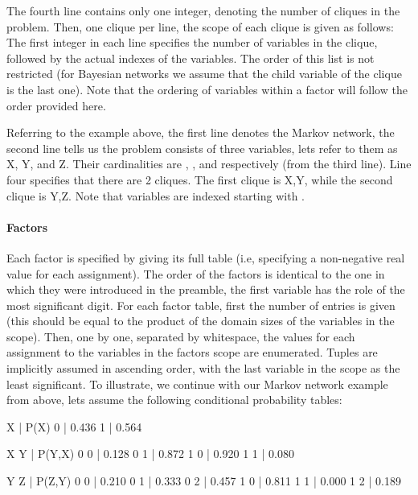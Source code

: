 The fourth line contains only one integer, denoting the number of cliques in the problem. Then, one clique per line, the scope of each clique is given as follows\+: The first integer in each line specifies the number of variables in the clique, followed by the actual indexes of the variables. The order of this list is not restricted (for Bayesian networks we assume that the child variable of the clique is the last one). Note that the ordering of variables within a factor will follow the order provided here.

Referring to the example above, the first line denotes the Markov network, the second line tells us the problem consists of three variables, let\textquotesingle{}s refer to them as {\ttfamily X}, {\ttfamily Y}, and {\ttfamily Z}. Their cardinalities are {}, {}, and {} respectively (from the third line). Line four specifies that there are 2 cliques. The first clique is {\ttfamily X,Y}, while the second clique is {\ttfamily Y,Z}. Note that variables are indexed starting with {}.

\paragraph*{Factors}

Each factor is specified by giving its full table (i.\+e, specifying a non-\/negative real value for each assignment). The order of the factors is identical to the one in which they were introduced in the preamble, the first variable has the role of the \textquotesingle{}most significant\textquotesingle{} digit. For each factor table, first the number of entries is given (this should be equal to the product of the domain sizes of the variables in the scope). Then, one by one, separated by whitespace, the values for each assignment to the variables in the factor\textquotesingle{}s scope are enumerated. Tuples are implicitly assumed in ascending order, with the last variable in the scope as the {\ttfamily least significant}. To illustrate, we continue with our Markov network example from above, let\textquotesingle{}s assume the following conditional probability tables\+: \begin{DoxyVerb}    X | P(X)  
    0 | 0.436 
    1 | 0.564 

    X   Y |  P(Y,X)
    0   0 |  0.128
    0   1 |  0.872
    1   0 |  0.920
    1   1 |  0.080

    Y   Z |  P(Z,Y)
    0   0 |  0.210
    0   1 |  0.333
    0   2 |  0.457
    1   0 |  0.811
    1   1 |  0.000
    1   2 |  0.189
\end{DoxyVerb}



